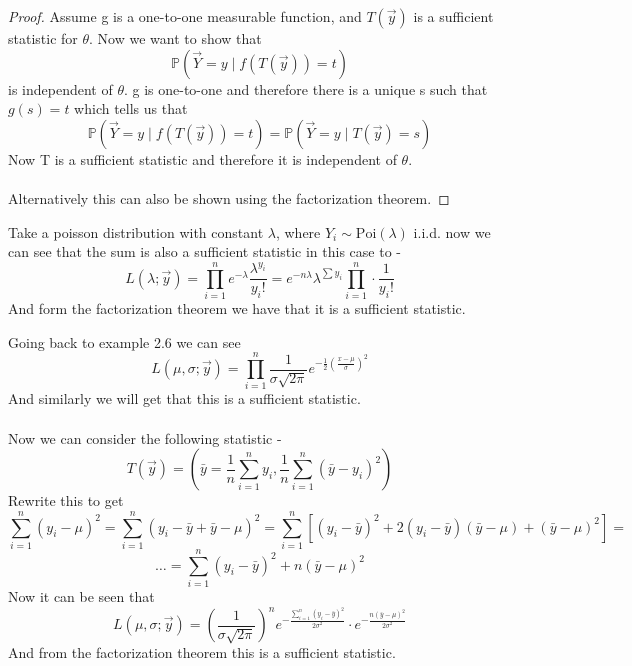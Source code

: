 \documentclass[../main.tex]{subfiles}
\begin{document}
\begin{proof}
Assume g is a one-to-one measurable function, and $T(\overrightarrow{y})$ is a sufficient statistic for $\theta$. Now we want to show that \[\mathbb{P}(\overrightarrow{Y}=y\mid f(T(\overrightarrow{y}))=t)\] is independent of $\theta$. g is one-to-one and therefore there is a unique s such that $g(s)=t$ which tells us that 
\[\mathbb{P}(\overrightarrow{Y}=y\mid f(T(\overrightarrow{y}))=t) = \mathbb{P}(\overrightarrow{Y}=y\mid T(\overrightarrow{y})=s)\]
Now T is a sufficient statistic and therefore it is independent of $\theta$. \\\\ Alternatively this can also be shown using the factorization theorem.\end{proof} 
\newpage 
\begin{example} Take a poisson distribution with constant $\lambda$, where $Y_i\sim\text{Poi}(\lambda)$ i.i.d. now we can see that the sum is also a sufficient statistic in this case to - \[L(\lambda;\overrightarrow{y}) = \prod_{i=1}^n e^{-\lambda}\frac{\lambda^{y_i}}{y_i!} = e^{-n\lambda}\lambda^{\sum y_i} \prod_{i=1}^n \cdot\frac{1}{y_i!}\]
And form the factorization theorem we have that it is a sufficient statistic. \end{example}
\begin{example} Going back to example 2.6 we can see \[L(\mu,\sigma;\overrightarrow{y}) = \prod_{i=1}^n \frac{1}{\sigma\sqrt{2\pi}}e^{-\frac{1}{2}(\frac{x-\mu}{\sigma})^2} \]
And similarly we will get that this is a sufficient statistic. \\\\
Now we can consider the following statistic - \[T(\overrightarrow{y})=\left(\bar{y}=\frac{1}{n}\sum_{i=1}^n y_i, \frac{1}{n}\sum_{i=1}^n (\bar{y}-y_i)^2\right)\]
Rewrite this to get \[\sum_{i=1}^n (y_i-\mu)^2  = \sum_{i=1}^n (y_i-\bar{y}+\bar{y}-\mu)^2 = \sum_{i=1}^n \left[(y_i-\bar{y})^2+2(y_i-\bar{y})(\bar{y}-\mu)+(\bar{y}-\mu)^2\right] = \]\[\dots= \sum_{i=1}^n (y_i-\bar{y})^2 + n(\bar{y}-\mu)^2 \]
Now it can be seen that \[L(\mu,\sigma;\overrightarrow{y}) = \left(\frac{1}{\sigma\sqrt{2\pi}}\right)^n e^{-\frac{\sum_{i=1}^n (y_i-\bar{y})^2}{2\sigma^2}}\cdot e^{-\frac{n(\bar{y}-\mu)^2}{2\sigma^2}}\]
And from the factorization theorem this is a sufficient statistic. \end{example}
\newpage
\end{document}
